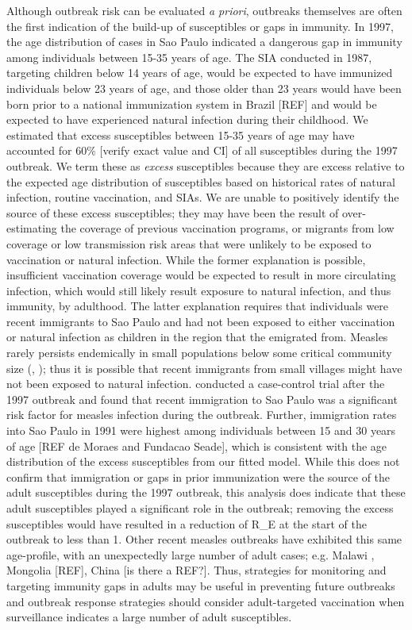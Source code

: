 Although outbreak risk can be evaluated \emph{a priori}, outbreaks themselves are often the first indication of the build-up of susceptibles or gaps in immunity. In 1997, the age distribution of cases in Sao Paulo indicated a dangerous gap in immunity among individuals between 15-35 years of
age. The SIA conducted in 1987, targeting children below 14 years of age, would be expected to have immunized individuals below 23 years of
age, and those older than 23 years would have been born prior to a national immunization system in Brazil {[}REF{]} and would be expected
to have experienced natural infection during their childhood. We estimated that excess susceptibles between 15-35 years of age may have accounted for 60\% {[}verify exact value and CI{]} of all susceptibles during the 1997 outbreak. We term these as \emph{excess} susceptibles because they are
excess relative to the expected age distribution of susceptibles based on historical rates of natural infection, routine vaccination, and SIAs. We are unable to positively identify the source of these excess susceptibles; they may have been the result of over-estimating the coverage of previous
vaccination programs, or migrants from low coverage or low transmission risk areas that were unlikely to be exposed to vaccination or natural infection. While the former explanation is possible, insufficient vaccination coverage would be expected to result in more circulating infection, which would still likely result exposure to natural infection, and thus immunity, by adulthood. The latter explanation requires that individuals were recent immigrants to Sao Paulo and had not been exposed to either vaccination or natural infection as children in the region that the emigrated from. Measles rarely persists endemically in small populations below some critical community size (\cite{Conlan_2007}, \cite{Keeling_1997}); thus it is possible that recent immigrants from small villages might have not been exposed to natural infection. \citet{Camargo_2000} conducted a case-control trial after the 1997
outbreak and found that recent immigration to Sao Paulo was a
significant risk factor for measles infection during the outbreak.
Further, immigration rates into Sao Paulo in 1991 were highest among
individuals between 15 and 30 years of age {[}REF de Moraes and Fundacao
Seade{]}, which is consistent with the age distribution of the excess
susceptibles from our fitted model. While this does not confirm that
immigration or gaps in prior immunization were the source of the adult
susceptibles during the 1997 outbreak, this analysis does indicate that
these adult susceptibles played a significant role in the outbreak;
removing the excess susceptibles would have resulted in a reduction of
R\_E at the start of the outbreak to less than 1. Other recent measles
outbreaks have exhibited this same age-profile, with an unexpectedly
large number of adult cases; e.g. Malawi \cite{Minetti_2013}, Mongolia
{[}REF{]}, China {[}is there a REF?{]}. Thus, strategies for monitoring
and targeting immunity gaps in adults may be useful in preventing future
outbreaks and outbreak response strategies should consider
adult-targeted vaccination when surveillance indicates a large number of
adult susceptibles.

